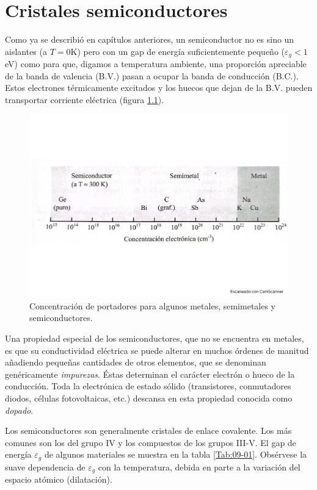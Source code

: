 \chapter{Cristales semiconductores} \label{Ch:09}

Como ya se describió en capítulos anteriores, un semiconductor no es sino un aislantes (a $T=0$K) pero con un gap de energía suficientemente pequeño ($\varepsilon_g <1$ eV) como para que, digamos a temperatura ambiente, una proporción apreciable de la banda de valencia (B.V.) pasan a ocupar la banda de conducción (B.C.). Estos electrones térmicamente excitados y los huecos que dejan de la B.V. pueden transportar corriente eléctrica (figura \ref{Fig:09-01}).


\begin{figure}[h!] \centering
	\includegraphics[scale=0.52]{Cuerpo/Ch_09/Fotos libro 1.pdf}
	\caption{Concentración de portadores para algunos metales, semimetales y semiconductores.}
	\label{Fig:09-01}
\end{figure}

Una propiedad especial de los semiconductores, que no se encuentra en metales, es que su conductividad eléctrica se puede alterar en muchos órdenes de manitud añadiendo pequeñas cantidades de otros elementos, que se denominan genéricamente \textit{impurezas}. Éstas determinan el carácter electrón o hueco de la conducción. Toda la electrónica de estado sólido (transistores, conmutadores diodos, células fotovoltaicas, etc.) descansa en esta propiedad conocida como \textit{dopado}.

Los semiconductores son generalmente cristales de enlace covalente. Los más comunes son los del grupo IV y los compuestos de los grupos III-V. El gap de energía $\varepsilon_g$ de algunos materiales se muestra en la tabla \ref{Tab:09-01}. Obsérvese la suave dependencia de $\varepsilon_g$ con la temperatura, debida en parte a la variación del espacio atómico (dilatación).

